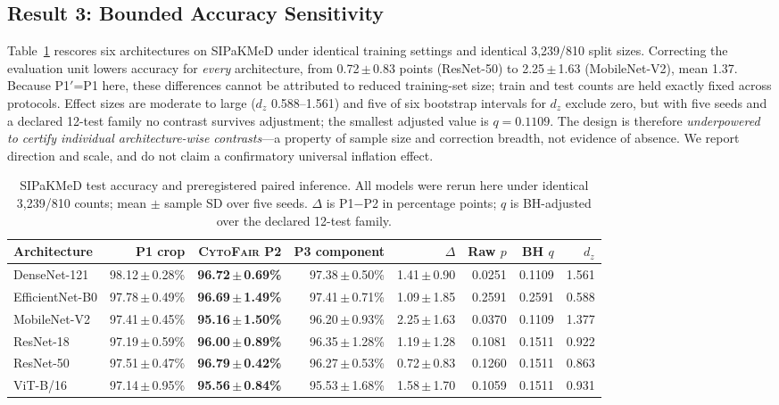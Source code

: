 \documentclass[conference]{IEEEtran}
\newcommand{\meanpm}[2]{#1\,$\pm$\,#2}
\newcommand{\protocol}[1]{\textsf{#1}}
\newcommand{\cytofair}{\textsc{CytoFair}}
\begin{document}
\subsection{Result 3: Bounded Accuracy Sensitivity}
Table~\ref{tab:joint} rescores six architectures on SIPaKMeD under identical training settings and identical 3,239/810 split sizes.
Correcting the evaluation unit lowers accuracy for \emph{every} architecture, from \meanpm{0.72}{0.83} points (ResNet-50) to \meanpm{2.25}{1.63} (MobileNet-V2), mean 1.37.
Because \protocol{P1$'$}=\protocol{P1} here, these differences cannot be attributed to reduced training-set size; train and test counts are held exactly fixed across protocols.
Effect sizes are moderate to large ($d_z$ 0.588--1.561) and five of six bootstrap intervals for $d_z$ exclude zero, but with five seeds and a declared 12-test family no contrast survives adjustment; the smallest adjusted value is $q=0.1109$.
The design is therefore \emph{underpowered to certify individual architecture-wise contrasts}---a property of sample size and correction breadth, not evidence of absence.
We report direction and scale, and do not claim a confirmatory universal inflation effect.

\begin{table}[t]
\caption{SIPaKMeD test accuracy and preregistered paired inference. All models were rerun here under identical 3,239/810 counts; mean $\pm$ sample SD over five seeds. $\Delta$ is \protocol{P1}$-$\protocol{P2} in percentage points; $q$ is BH-adjusted over the declared 12-test family.}
\label{tab:joint}
\centering
\scriptsize
\setlength{\tabcolsep}{5.5pt}
\begin{tabular}{lrrrrrrr}
\toprule
Architecture & \protocol{P1} crop & \textbf{\cytofair{} \protocol{P2}} & \protocol{P3} component & $\Delta$ & Raw $p$ & BH $q$ & $d_z$ \\
\midrule
DenseNet-121 & \meanpm{98.12}{0.28}\% & \textbf{\meanpm{96.72}{0.69}\%} & \meanpm{97.38}{0.50}\% & \meanpm{1.41}{0.90} & 0.0251 & 0.1109 & 1.561 \\
EfficientNet-B0 & \meanpm{97.78}{0.49}\% & \textbf{\meanpm{96.69}{1.49}\%} & \meanpm{97.41}{0.71}\% & \meanpm{1.09}{1.85} & 0.2591 & 0.2591 & 0.588 \\
MobileNet-V2 & \meanpm{97.41}{0.45}\% & \textbf{\meanpm{95.16}{1.50}\%} & \meanpm{96.20}{0.93}\% & \meanpm{2.25}{1.63} & 0.0370 & 0.1109 & 1.377 \\
ResNet-18 & \meanpm{97.19}{0.59}\% & \textbf{\meanpm{96.00}{0.89}\%} & \meanpm{96.35}{1.28}\% & \meanpm{1.19}{1.28} & 0.1081 & 0.1511 & 0.922 \\
ResNet-50 & \meanpm{97.51}{0.47}\% & \textbf{\meanpm{96.79}{0.42}\%} & \meanpm{96.27}{0.53}\% & \meanpm{0.72}{0.83} & 0.1260 & 0.1511 & 0.863 \\
ViT-B/16 & \meanpm{97.14}{0.95}\% & \textbf{\meanpm{95.56}{0.84}\%} & \meanpm{95.53}{1.68}\% & \meanpm{1.58}{1.70} & 0.1059 & 0.1511 & 0.931 \\
\bottomrule
\end{tabular}
\end{table}
\end{document}
